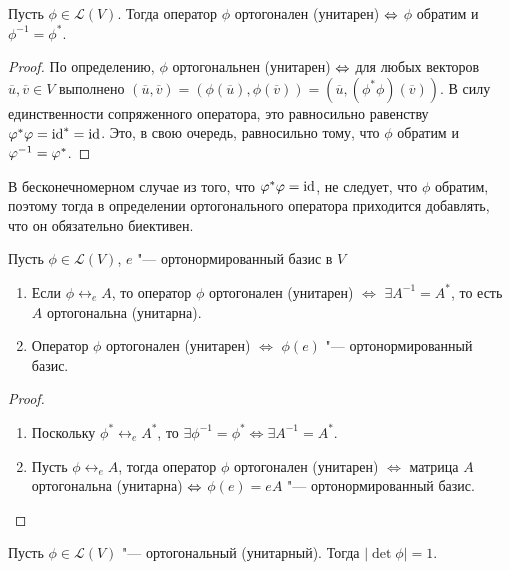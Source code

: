 \begin{theorem}
	Пусть $\phi \in \mathcal{L}(V)$. Тогда оператор $\phi$ ортогонален (унитарен) $\hm\Leftrightarrow$ $\phi$ обратим и $\phi^{-1} = \phi^{*}$.
\end{theorem}

\begin{proof}
	По определению, $\phi$ ортогональнен (унитарен) $\hm{\Leftrightarrow}$ для любых векторов $\overline{u}, \overline{v} \in V$ выполнено $(\overline{u}, \overline{v}) = (\phi(\overline{u}), \phi(\overline{v})) = (\overline{u}, (\phi^*\phi)(\overline{v}))$. В силу единственности сопряженного оператора, это равносильно равенству $\varphi^*\varphi = \operatorname{id}^* = \operatorname{id}$. Это, в свою очередь, равносильно тому, что $\phi$ обратим и $\phi^{-1} \hm{=} \phi^{*}$.
\end{proof}

\begin{note}
	В бесконечномерном случае из того, что $\varphi^*\varphi = \operatorname{id}$, не следует, что $\phi$ обратим, поэтому тогда в определении ортогонального оператора приходится добавлять, что он обязательно биективен.
\end{note}

\begin{corollary}
	Пусть $\phi \in \mathcal{L}(V)$, $e$ "--- ортонормированный базис в $V$
	\begin{enumerate}
		\item Если $\phi \leftrightarrow_e A$, то оператор $\phi$ ортогонален (унитарен) $\Leftrightarrow$ $\exists A^{-1} = A^*$, то есть $A$ ортогональна (унитарна).
		\item Оператор $\phi$ ортогонален (унитарен) $\Leftrightarrow$ $\phi(e)$ "--- ортонормированный базис.
	\end{enumerate}
\end{corollary}

\begin{proof}~
	\begin{enumerate}
		\item Поскольку $\phi^* \leftrightarrow_e A^*$, то $\exists \phi^{-1} = \phi^* \Leftrightarrow \exists A^{-1} = A^{*}$.
		\item Пусть $\phi \leftrightarrow_e A$, тогда оператор $\phi$ ортогонален (унитарен) $\Leftrightarrow$ матрица $A$ ортогональна (унитарна) $\Leftrightarrow$ $\phi(e) = eA$ "--- ортонормированный базис.\qedhere
	\end{enumerate}
\end{proof}

\begin{corollary}
	Пусть $\phi \in \mathcal{L}(V)$ "--- ортогональный (унитарный). Тогда $|\det\phi| = 1$.
\end{corollary}

